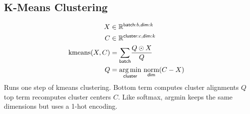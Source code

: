 \documentclass{article}
\newcommand{\reals}[0]{\mathbb{R}}
\newcommand{\nsum}[1]{\mathbin{\mathop{\sum}\displaylimits_{\name{#1}}}}
\newcommand{\nfun}[2]{\underset{\name{#1}}{#2}}
\newcommand{\name}[1]{\mathsf{#1}}
\begin{document}
\subsection*{K-Means Clustering}

\begin{align*} 
X &\in \reals^{\name{batch}:b, \name{dim}:k}  \\
C &\in \reals^{\name{cluster}:c, \name{dim}:k}  \\
\text{kmeans}(X, C) &= \nsum{batch} \frac{ Q \odot X}{  Q} \\
Q &= \nfun{cluster}{\arg\min} \ \nfun{dim}{\text{norm}}(C-X
)\end{align*}
Runs one step of kmeans clustering. Bottom term computes cluster alignments $Q$ top term recomputes cluster centers $C$. Like softmax, argmin keeps the same dimensions but uses a 1-hot encoding.
\end{document}
